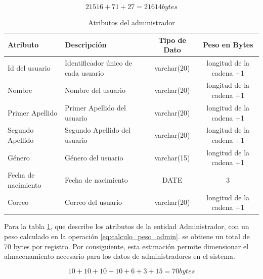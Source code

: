 \begin{equation}
21516 + 71 + 27 = 21614 bytes
\label{eq:calculo_peso_total_usuario}
\end{equation}

\begin{table}[htbp]
    \centering
    \caption{Atributos del administrador} %
    \label{tab:Dato3}
    \footnotesize %

    \begin{tabular}{|>{\raggedright\arraybackslash}p{2.5cm}|>{\raggedright\arraybackslash}p{6.0cm}|c|c|}
        \hline
        \textbf{Atributo} & \textbf{Descripción} & \textbf{Tipo de Dato} & \textbf{Peso en Bytes} \\ \hline
        Id del usuario & Identificador único de cada usuario & varchar(20) & longitud de la cadena +1 \\ \hline
        Nombre & Nombre del usuario & varchar(20) & longitud de la cadena +1 \\ \hline %
        Primer Apellido & Primer Apellido del usuario & varchar(20) & longitud de la cadena +1 \\ \hline
        Segundo Apellido & Segundo Apellido del usuario & varchar(20) & longitud de la cadena +1 \\ \hline
        Género & Género del usuario & varchar(15) & longitud de la cadena +1 \\ \hline
        Fecha de nacimiento & Fecha de nacimiento & DATE & 3 \\ \hline
        Correo & Correo del usuario & varchar(20) & longitud de la cadena +1 \\ \hline
    \end{tabular}
\end{table}


Para la tabla \ref{tab:Dato3}, que describe los atributos de
la entidad Administrador, con un peso calculado en la operación \ref{eq:calculo_peso_admin}. 
se obtiene un total de 70 bytes por registro. Por consiguiente, esta estimación 
permite dimensionar el almacenamiento necesario para los datos de administradores 
en el sistema.

\begin{equation}
10 + 10 + 10 + 10 + 6 + 3 + 15 = 70 bytes
\label{eq:calculo_peso_admin}
\end{equation}